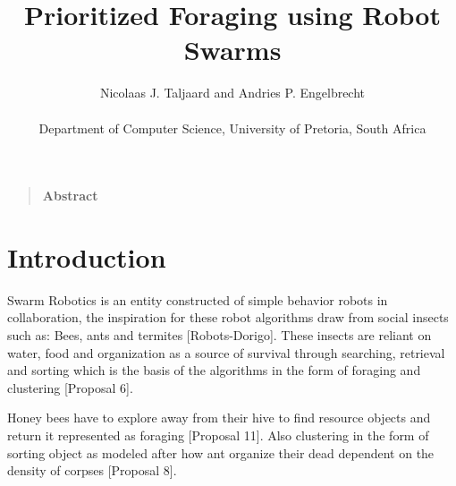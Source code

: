 \documentclass[12pt]{article}
\title{Prioritized Foraging using Robot Swarms}
\author
{Nicolaas J. Taljaard and Andries P. Engelbrecht\\
\\
\normalsize{Department of Computer Science, University of Pretoria, South Africa}\\
}
\date{}
\newenvironment{sciabstract}{%
\begin{quote} \bf}
{\end{quote}}
\begin{document}
 


\baselineskip24pt


\maketitle 




\begin{sciabstract}
  Abstract
\end{sciabstract}




\section*{Introduction}

\par{Swarm Robotics is an entity constructed of simple behavior  robots in collaboration, the inspiration for these robot algorithms draw from social insects such as: Bees, ants and termites [Robots-Dorigo]. These insects are reliant on water, food and organization as a source of survival through searching, retrieval and sorting which is the basis of the algorithms in the form of foraging and clustering [Proposal 6].}
\\
\par{Honey bees have to explore away from their hive to find resource objects and return it represented as foraging [Proposal 11]. Also clustering in the form of sorting object as modeled after how ant organize their dead dependent on the density of corpses [Proposal 8].}
\end{document}
